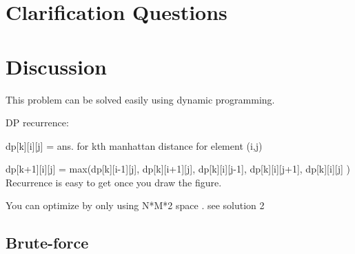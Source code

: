 \section{Clarification Questions}

\begin{QandA}
	\item 
	\begin{answered}
		\textit{}
	\end{answered}
	
\end{QandA}

\section{Discussion}
\label{max_manhattan:sec:discussion}
This problem can be solved easily using dynamic programming.

DP recurrence:

dp[k][i][j] = ans. for kth manhattan distance for element (i,j)

dp[k+1][i][j] = max(dp[k][i-1][j], dp[k][i+1][j], dp[k][i][j-1], dp[k][i][j+1], dp[k][i][j] )
Recurrence is easy to get once you draw the figure.


You can optimize by only using N*M*2 space . see solution 2

\subsection{Brute-force}
\label{max_manhattan:sec:bruteforce}

\begin{minipage}{\linewidth}
	
\end{minipage}

